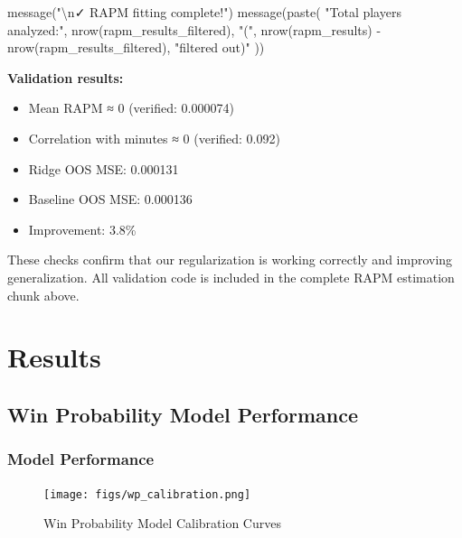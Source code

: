 \documentclass[
  letterpaper,
  DIV=11,
  numbers=noendperiod]{scrartcl}
\newenvironment{Shaded}{\begin{snugshade}}{\end{snugshade}}
\newcommand{\FunctionTok}[1]{\textcolor[rgb]{0.28,0.35,0.67}{#1}}
\newcommand{\NormalTok}[1]{\textcolor[rgb]{0.00,0.23,0.31}{#1}}
\newcommand{\SpecialCharTok}[1]{\textcolor[rgb]{0.37,0.37,0.37}{#1}}
\newcommand{\StringTok}[1]{\textcolor[rgb]{0.13,0.47,0.30}{#1}}
\providecommand{\tightlist}{%
  \setlength{\itemsep}{0pt}\setlength{\parskip}{0pt}}
\begin{document}
\begin{Shaded}
\begin{Highlighting}[]
\FunctionTok{message}\NormalTok{(}\StringTok{"}\SpecialCharTok{\textbackslash{}n}\StringTok{✓ RAPM fitting complete!"}\NormalTok{)}
\FunctionTok{message}\NormalTok{(}\FunctionTok{paste}\NormalTok{(}
  \StringTok{"Total players analyzed:"}\NormalTok{, }\FunctionTok{nrow}\NormalTok{(rapm\_results\_filtered),}
  \StringTok{"("}\NormalTok{, }\FunctionTok{nrow}\NormalTok{(rapm\_results) }\SpecialCharTok{{-}} \FunctionTok{nrow}\NormalTok{(rapm\_results\_filtered), }\StringTok{"filtered out)"}
\NormalTok{))}
\end{Highlighting}
\end{Shaded}

\textbf{Validation results:}

\begin{itemize}
\tightlist
\item
  Mean RAPM ≈ 0 (verified: 0.000074)
\item
  Correlation with minutes ≈ 0 (verified: 0.092)
\item
  Ridge OOS MSE: 0.000131
\item
  Baseline OOS MSE: 0.000136\\
\item
  Improvement: 3.8\%
\end{itemize}

These checks confirm that our regularization is working correctly and
improving generalization. All validation code is included in the
complete RAPM estimation chunk above.

\section{Results}\label{results}

\subsection{Win Probability Model
Performance}\label{win-probability-model-performance}

\subsubsection{Model Performance}\label{model-performance}

\begin{figure}[H]

{\centering \texttt{[image: figs/wp\_calibration.png]}

}

\caption{Win Probability Model Calibration Curves}

\end{figure}%
\end{document}
